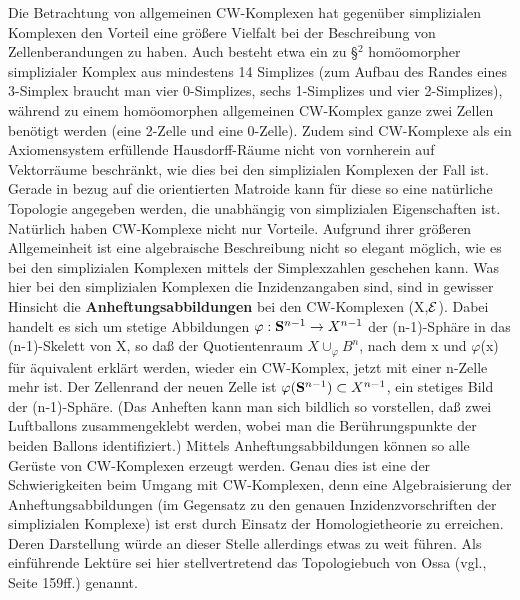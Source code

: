 Die Betrachtung von allgemeinen CW-Komplexen hat gegenüber simplizialen
Komplexen den Vorteil eine größere Vielfalt bei der Beschreibung von
Zellenberandungen zu haben. Auch besteht etwa ein zu \S$^2$ homöomorpher
simplizialer Komplex aus mindestens 14 Simplizes (zum Aufbau des Randes eines
3-Simplex braucht man vier 0-Simplizes, sechs 1-Simplizes und vier 2-Simplizes),
während zu einem homöomorphen allgemeinen CW-Komplex ganze zwei Zellen
benötigt werden (eine 2-Zelle und eine 0-Zelle). Zudem sind CW-Komplexe als
ein Axiomensystem erfüllende Hausdorff-Räume nicht von vornherein auf
Vektorräume beschränkt, wie dies bei den simplizialen Komplexen der Fall ist.
Gerade in bezug auf die orientierten Matroide kann für diese so eine
natürliche Topologie angegeben werden, die unabhängig von simplizialen
Eigenschaften ist.\\
Natürlich haben CW-Komplexe nicht nur Vorteile. Aufgrund ihrer größeren
Allgemeinheit ist eine algebraische Beschreibung nicht so elegant
möglich, wie es bei den simplizialen Komplexen mittels der Simplexzahlen
geschehen kann. Was hier bei den simplizialen Komplexen die Inzidenzangaben
sind, sind in gewisser Hinsicht die {\bf Anheftungsabbildungen} bei den
CW-Komplexen (X,$\cal E$). Dabei handelt es sich um
 stetige Abbildungen
$\varphi:\S^{n-1}\to X^{n-1}$ der (n-1)-Sphäre in das (n-1)-Skelett von X, so
daß der Quotientenraum $X\cup_{\varphi} B^n$, nach
dem x und $\varphi$(x) für äquivalent erklärt werden, wieder ein CW-Komplex,
jetzt mit einer n-Zelle mehr ist. Der Zellenrand der neuen Zelle ist
$\varphi(\S^{n-1})\subset X^{n-1}$, ein stetiges Bild der (n-1)-Sphäre.
(Das Anheften kann man sich bildlich so vorstellen, daß zwei Luftballons
zusammengeklebt werden, wobei man die Berührungspunkte der beiden Ballons
identifiziert.) Mittels Anheftungsabbildungen können so alle Gerüste
von CW-Komplexen erzeugt werden. Genau dies ist eine der Schwierigkeiten beim
Umgang mit CW-Komplexen, denn eine Algebraisierung der Anheftungsabbildungen
(im Gegensatz zu den genauen Inzidenzvorschriften der simplizialen Komplexe) ist
erst durch Einsatz der Homologietheorie zu erreichen. Deren Darstellung würde
an dieser Stelle allerdings etwas zu weit führen. Als einführende Lektüre sei
hier stellvertretend das Topologiebuch von Ossa (vgl.\cite{Os:92}, Seite 159ff.)
genannt.

